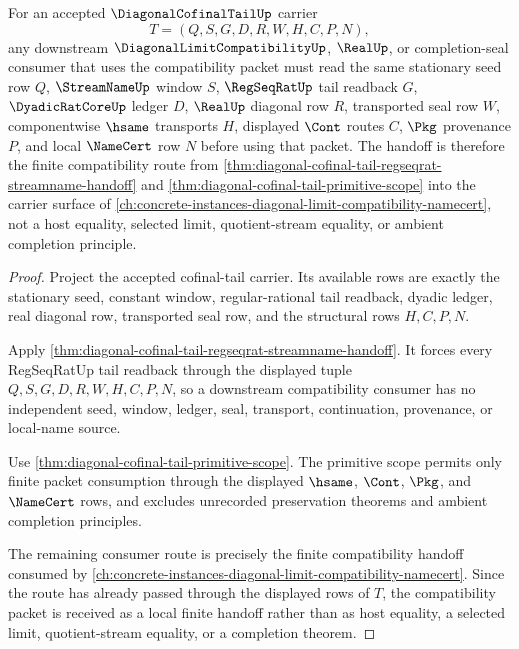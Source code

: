 \begin{theorem}
\label{thm:diagonal-cofinal-tail-compatibility-handoff}
For an accepted $\DiagonalCofinalTailUp$ carrier
$$
T=(Q,S,G,D,R,W,H,C,P,N),
$$
any downstream $\DiagonalLimitCompatibilityUp$, $\RealUp$, or completion-seal consumer that uses the compatibility packet must read the same stationary seed row $Q$, $\StreamNameUp$ window $S$, $\RegSeqRatUp$ tail readback $G$, $\DyadicRatCoreUp$ ledger $D$, $\RealUp$ diagonal row $R$, transported seal row $W$, componentwise $\hsame$ transports $H$, displayed $\Cont$ routes $C$, $\Pkg$ provenance $P$, and local $\NameCert$ row $N$ before using that packet. The handoff is therefore the finite compatibility route from \autoref{thm:diagonal-cofinal-tail-regseqrat-streamname-handoff} and \autoref{thm:diagonal-cofinal-tail-primitive-scope} into the carrier surface of \autoref{ch:concrete-instances-diagonal-limit-compatibility-namecert}, not a host equality, selected limit, quotient-stream equality, or ambient completion principle.
\end{theorem}
\begin{proof}
Project the accepted cofinal-tail carrier. Its available rows are exactly the stationary seed, constant window, regular-rational tail readback, dyadic ledger, real diagonal row, transported seal row, and the structural rows $H,C,P,N$.

Apply \autoref{thm:diagonal-cofinal-tail-regseqrat-streamname-handoff}. It forces every RegSeqRatUp tail readback through the displayed tuple $Q,S,G,D,R,W,H,C,P,N$, so a downstream compatibility consumer has no independent seed, window, ledger, seal, transport, continuation, provenance, or local-name source.

Use \autoref{thm:diagonal-cofinal-tail-primitive-scope}. The primitive scope permits only finite packet consumption through the displayed $\hsame$, $\Cont$, $\Pkg$, and $\NameCert$ rows, and excludes unrecorded preservation theorems and ambient completion principles.

The remaining consumer route is precisely the finite compatibility handoff consumed by \autoref{ch:concrete-instances-diagonal-limit-compatibility-namecert}. Since the route has already passed through the displayed rows of $T$, the compatibility packet is received as a local finite handoff rather than as host equality, a selected limit, quotient-stream equality, or a completion theorem.
\end{proof}

